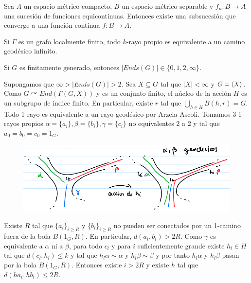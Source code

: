 \documentclass[twoside, 11pt]{article}
\begin{document}
\begin{teorema}
Sea $A$ un espacio métrico compacto, $B$ un espacio métrico separable y $f_n:B\to A$ una sucesión de funciones equicontinuas. Entonces existe una subsucesión que converge a una función continua $f:B\to A$.
\end{teorema}

\begin{coro}
Si $\Gamma$ es un grafo localmente finito, todo $k$-rayo propio es equivalente a un camino geodésico infinito.
\end{coro}

\begin{prop}
Si $G$ es finitamente generado, entonces $|Ends(G)|\in\{0,1,2,\infty\}$.
\end{prop}
\begin{dem}
Supongamos que $\infty>|Ends(G)|>2$. Sea $X\subseteq G$ tal que $|X|<\infty$ y $G=\langle{X}\rangle$. Como $G\curvearrowright End(\Gamma(G,X))$ y es un conjunto finito, el núcleo de la acción $H$ es un subgrupo de índice finito. En particular, existe $r$ tal que $\bigcup_{h\in H}B(h,r)=G$. Todo 1-rayo es equivalente a un rayo geodésico por Arzela-Ascoli. Tomamos 3 1-rayos propios $\alpha=\{a_i\}, \beta=\{b_i\}, \gamma=\{c_i\}$ no equivalentes 2 a 2 y tal que $a_0=b_0=c_0=1_G$.
\begin{figure}[h!]
\includegraphics[scale=0.5]{dibu}
\end{figure}

Existe $R$ tal que $\{a_i\}_{i\geq R}$ y $\{b_i\}_{i\geq R}$ no pueden ser conectados por un 1-camino fuera de la bola $B(1_G,R)$. En particular, $d(a_i,b_i)>2R$. Como $\gamma$ es equivalente a $\alpha$ ni a $\beta$, para todo $c_l$ y para $i$ suficientemente grande existe $h_l\in H$ tal que $d(c_l,h_l)\leq k$ y tal que $h_l\alpha\sim \alpha$ y $h_l\beta\sim\beta$ y por tanto $h_l\alpha$ y $h_l\beta$ pasan por la bola $B(1_G,R)$. Entonces existe $i>2R$ y existe $h$ tal que $d(ha_i,hb_i)\leq 2R$.
\QED
\end{dem}
\end{document}
